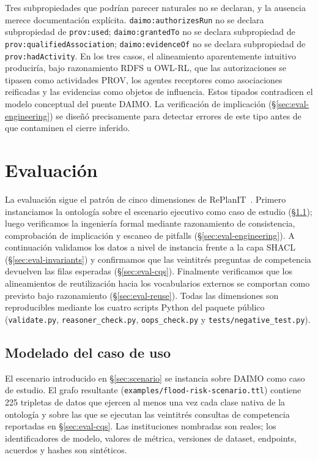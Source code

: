 \documentclass[Afour,sagev,times]{sagej}
\newcommand{\code}[1]{\texttt{#1}}
\begin{document}
Tres subpropiedades que podrían parecer naturales no se declaran, y la ausencia merece documentación explícita. \code{daimo:authorizesRun} no se declara subpropiedad de \code{prov:used}; \code{daimo:grantedTo} no se declara subpropiedad de \code{prov:qualifiedAssociation}; \code{daimo:evidenceOf} no se declara subpropiedad de \code{prov:hadActivity}. En los tres casos, el alineamiento aparentemente intuitivo produciría, bajo razonamiento RDFS u OWL-RL, que las autorizaciones se tipasen como actividades PROV, los agentes receptores como asociaciones reificadas y las evidencias como objetos de influencia. Estos tipados contradicen el modelo conceptual del puente DAIMO. La verificación de implicación (§\ref{sec:eval-engineering}) se diseñó precisamente para detectar errores de este tipo antes de que contaminen el cierre inferido.

\section{Evaluación}\label{sec:eval}

La evaluación sigue el patrón de cinco dimensiones de RePlanIT~\cite{kurteva}. Primero instanciamos la ontología sobre el escenario ejecutivo como caso de estudio (§\ref{sec:eval-usecase}); luego verificamos la ingeniería formal mediante razonamiento de consistencia, comprobación de implicación y escaneo de pitfalls (§\ref{sec:eval-engineering}). A continuación validamos los datos a nivel de instancia frente a la capa SHACL (§\ref{sec:eval-invariants}) y confirmamos que las veintitrés preguntas de competencia devuelven las filas esperadas (§\ref{sec:eval-cqs}). Finalmente verificamos que los alineamientos de reutilización hacia los vocabularios externos se comportan como previsto bajo razonamiento (§\ref{sec:eval-reuse}). Todas las dimensiones son reproducibles mediante los cuatro scripts Python del paquete público (\code{validate.py}, \code{reasoner\_check.py}, \code{oops\_check.py} y \code{tests/negative\_test.py}).

\subsection{Modelado del caso de uso}\label{sec:eval-usecase}

El escenario introducido en §\ref{sec:scenario} se instancia sobre DAIMO como caso de estudio. El grafo resultante (\code{examples/flood-risk-scenario.ttl}) contiene 225 tripletas de datos que ejercen al menos una vez cada clase nativa de la ontología y sobre las que se ejecutan las veintitrés consultas de competencia reportadas en §\ref{sec:eval-cqs}. Las instituciones nombradas son reales; los identificadores de modelo, valores de métrica, versiones de dataset, endpoints, acuerdos y hashes son sintéticos.
\end{document}

